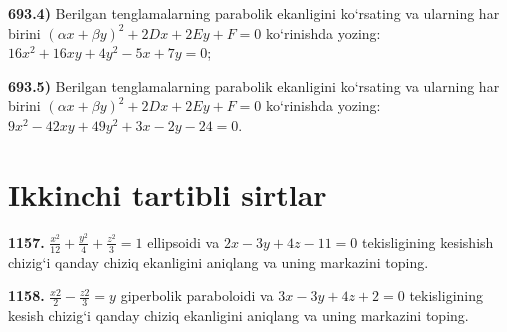 \textbf{693.4)} Berilgan tenglamalarning parabolik ekanligini ko‘rsating va ularning har birini $(\alpha x+\beta y)^2+2 D x+2 E y+F=0$ ko‘rinishda yozing: $16 x^2+16 x y+4 y^2-5 x+7 y=0$;

\textbf{693.5)} Berilgan tenglamalarning parabolik ekanligini ko‘rsating va ularning har birini $(\alpha x+\beta y)^2+2 D x+2 E y+F=0$ ko‘rinishda yozing: $9 x^2-42 x y+49 y^2+3 x-2 y-24=0$.



\section{Ikkinchi tartibli sirtlar}



\textbf{1157.} $\frac{x^2}{12}+\frac{y^2}{4}+\frac{z^2}{3}=1$ ellipsoidi va $2x-3y+4z-11=0$ tekisligining kesishish chizig‘i qanday chiziq ekanligini aniqlang va uning markazini toping.

\textbf{1158.} $\frac{x2}{2}-\frac{z2}{3}=y$ giperbolik paraboloidi va $3x-3y+4z+2=0$ tekisligining kesish chizig‘i qanday chiziq ekanligini aniqlang va uning markazini toping.